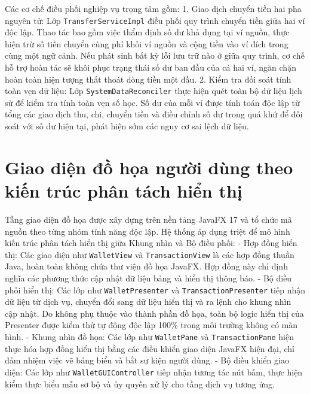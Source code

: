 \documentclass[a4paper,12pt]{report}
\newcommand{\passthrough}[1]{#1}
\begin{document}
Các cơ chế điều phối nghiệp vụ trọng tâm gồm: 1. Giao dịch chuyển tiền
hai pha nguyên tử: Lớp \passthrough{\lstinline!TransferServiceImpl!}
điều phối quy trình chuyển tiền giữa hai ví độc lập. Thao tác bao gồm
việc thẩm định số dư khả dụng tại ví nguồn, thực hiện trừ số tiền chuyển
cùng phí khỏi ví nguồn và cộng tiền vào ví đích trong cùng một ngữ cảnh.
Nếu phát sinh bất kỳ lỗi lưu trữ nào ở giữa quy trình, cơ chế hỗ trợ
hoàn tác sẽ khôi phục trạng thái số dư ban đầu của cả hai ví, ngăn chặn
hoàn toàn hiện tượng thất thoát dòng tiền một đầu. 2. Kiểm tra đối soát
tính toàn vẹn dữ liệu: Lớp
\passthrough{\lstinline!SystemDataReconciler!} thực hiện quét toàn bộ dữ
liệu lịch sử để kiểm tra tính toàn vẹn số học. Số dư của mỗi ví được
tính toán độc lập từ tổng các giao dịch thu, chi, chuyển tiền và điều
chỉnh số dư trong quá khứ để đối soát với số dư hiện tại, phát hiện sớm
các nguy cơ sai lệch dữ liệu.

\section{Giao diện đồ họa người dùng theo kiến trúc phân tách hiển
thị}\label{giao-diux1ec7n-ux111ux1ed3-hux1ecda-ngux1b0ux1eddi-duxf9ng-theo-kiux1ebfn-truxfac-phuxe2n-tuxe1ch-hiux1ec3n-thux1ecb}

Tầng giao diện đồ họa được xây dựng trên nền tảng JavaFX 17 và tổ chức
mã nguồn theo từng nhóm tính năng độc lập. Hệ thống áp dụng triệt để mô
hình kiến trúc phân tách hiển thị giữa Khung nhìn và Bộ điều phối: - Hợp
đồng hiển thị: Các giao diện như \passthrough{\lstinline!WalletView!} và
\passthrough{\lstinline!TransactionView!} là các hợp đồng thuần Java,
hoàn toàn không chứa thư viện đồ họa JavaFX. Hợp đồng này chỉ định nghĩa
các phương thức cập nhật dữ liệu bảng và hiển thị thông báo. - Bộ điều
phối hiển thị: Các lớp như \passthrough{\lstinline!WalletPresenter!} và
\passthrough{\lstinline!TransactionPresenter!} tiếp nhận dữ liệu từ dịch
vụ, chuyển đổi sang dữ liệu hiển thị và ra lệnh cho khung nhìn cập nhật.
Do không phụ thuộc vào thành phần đồ họa, toàn bộ logic hiển thị của
Presenter được kiểm thử tự động độc lập 100\% trong môi trường không có
màn hình. - Khung nhìn đồ họa: Các lớp như
\passthrough{\lstinline!WalletPane!} và
\passthrough{\lstinline!TransactionPane!} hiện thực hóa hợp đồng hiển
thị bằng các điều khiển giao diện JavaFX hiện đại, chỉ đảm nhiệm việc vẽ
bảng biểu và bắt sự kiện người dùng. - Bộ điều khiển giao diện: Các lớp
như \passthrough{\lstinline!WalletGUIController!} tiếp nhận tương tác
nút bấm, thực hiện kiểm thực biểu mẫu sơ bộ và ủy quyền xử lý cho tầng
dịch vụ tương ứng.
\end{document}
